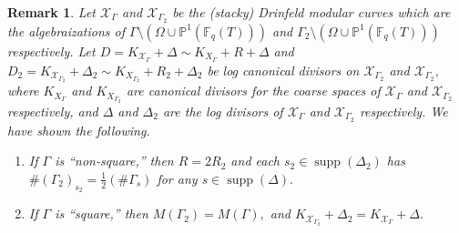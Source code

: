 \documentclass[11pt]{amsart}
\newtheorem{corollary}[theorem]{Corollary}
\newtheorem{remark}[theorem]{Remark}
\theoremstyle{definition}
\numberwithin{equation}{section}
\newcommand{\cC}{\mathcal{C}}		%
\newcommand{\sX}{\mathscr{X}}		%
\newcommand{\bbF}{\mathbb{F}}		%
\newcommand{\bbP}{\mathbb{P}}		%
\begin{document}
\begin{remark}
	Let $\sX_{\Gamma}$ and $\sX_{\Gamma_2}$ be the (stacky) Drinfeld modular curves which are the algebraizations of $\Gamma\setminus(\Omega\cup \bbP^1(\bbF_q(T)))$ and $\Gamma_2\setminus(\Omega\cup \bbP^1(\bbF_q(T)))$ respectively.
	Let $\displaystyle{D=K_{\sX_{\Gamma}}+\Delta\sim K_{X_{\Gamma}}+R+\Delta}$ and $\displaystyle{D_2=K_{\sX_{\Gamma_2}}+\Delta_2\sim K_{X_{\Gamma_2}}+R_2+\Delta_2}$ be log canonical divisors on $\sX_{\Gamma_2}$ and $\sX_{\Gamma_2},$ where
	$K_{X_{\Gamma}}$ and $K_{X_{\Gamma_2}}$ are canonical divisors for the coarse spaces of $\sX_{\Gamma}$ and $\sX_{\Gamma_2}$ respectively, and $\Delta$ and $\Delta_2$ are the log divisors of $\sX_{\Gamma}$ and $\sX_{\Gamma_2}$ respectively. We have shown the following.
	\begin{enumerate}
		\item If $\Gamma$ is ``non-square,'' then
		$R=2R_2$ and each $s_2\in \operatorname{supp}(\Delta_2)$ has $\#(\Gamma_2)_{s_2}=\frac{1}{2}(\#\Gamma_s)$ for any $s\in \operatorname{supp}(\Delta).$
		
		\item If $\Gamma$ is ``square,'' then $M(\Gamma_2)=M(\Gamma),$ and $K_{\sX_{\Gamma_2}}+\Delta_2=K_{\sX_{\Gamma}}+\Delta.$ 
	\end{enumerate}
\end{remark}

\end{document}
